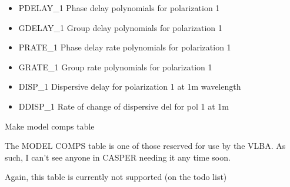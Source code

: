 \documentclass[letterpaper,10pt,english]{sphinxmanual}
\begin{document}
\begin{fulllineitems}
\begin{itemize}
\item {} 
PDELAY\_1      Phase delay polynomials for polarization 1

\item {} 
GDELAY\_1      Group delay polynomials for polarization 1

\item {} 
PRATE\_1       Phase delay rate polynomials for polarization 1

\item {} 
GRATE\_1       Group rate polynomials for polarization 1

\item {} 
DISP\_1        Dispersive delay for polarization 1 at 1m wavelength

\item {} 
DDISP\_1       Rate of change of dispersive del for pol 1 at 1m

\end{itemize}

\end{fulllineitems}



\begin{fulllineitems}
\label{index:pyFitsidi.make_model_comps}
Make model comps table

The MODEL COMPS table is one of those reserved for use by the VLBA.
As such, I can't see anyone in CASPER needing it any time soon.

Again, this table is currently not supported (on the todo list)

\end{fulllineitems}


\end{document}
